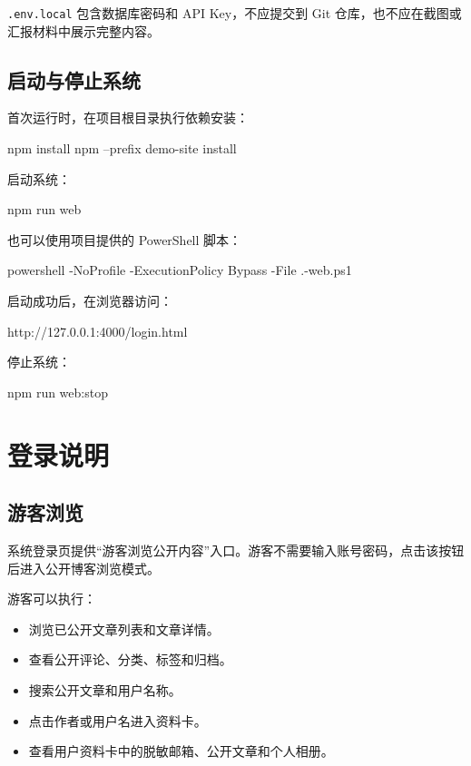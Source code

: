 \documentclass[UTF8,a4paper,12pt]{ctexart}
\newcommand{\code}[1]{\texttt{#1}}
\begin{document}
\code{.env.local} 包含数据库密码和 API Key，不应提交到 Git 仓库，也不应在截图或汇报材料中展示完整内容。

\subsection{启动与停止系统}

首次运行时，在项目根目录执行依赖安装：

\begin{codeblock}
npm install
npm --prefix demo-site install
\end{codeblock}

启动系统：

\begin{codeblock}
npm run web
\end{codeblock}

也可以使用项目提供的 PowerShell 脚本：

\begin{codeblock}
powershell -NoProfile -ExecutionPolicy Bypass -File .\start-web.ps1
\end{codeblock}

启动成功后，在浏览器访问：

\begin{codeblock}
http://127.0.0.1:4000/login.html
\end{codeblock}

停止系统：

\begin{codeblock}
npm run web:stop
\end{codeblock}

\section{登录说明}

\subsection{游客浏览}

系统登录页提供“游客浏览公开内容”入口。游客不需要输入账号密码，点击该按钮后进入公开博客浏览模式。

游客可以执行：

\begin{itemize}
  \item 浏览已公开文章列表和文章详情。
  \item 查看公开评论、分类、标签和归档。
  \item 搜索公开文章和用户名称。
  \item 点击作者或用户名进入资料卡。
  \item 查看用户资料卡中的脱敏邮箱、公开文章和个人相册。
\end{itemize}
\end{document}
